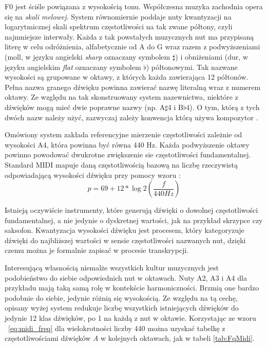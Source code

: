 \documentclass[12pt,a4paper,twoside]{mwart}
\begin{document}
F0 jest ściśle powiązana z wysokością tonu. Współczesna muzyka zachodnia opera się na \textit{skali melowej}. System równomiernie poddaje nuty kwantyzacji na logarytmicznej skali spektrum częstotliwości na tak zwane półtony, czyli najmniejsze interwały. Każda z tak powstałych muzycznych nut ma przypisaną literę w celu odróżnienia, alfabetycznie od A do G wraz razem z podwyższeniami (moll, w języku angielski \textit{sharp} oznaczany symbolem $\sharp$) i obniżeniami (dur, w języku angielskim \textit{flat} oznaczany symbolem $\flat$) półtonowymi. Tak nazwane wysokości są grupowane w oktawy, z których każda zawierająca 12 półtonów. Pełna nazwa granego dźwięku powinna zawierać nazwę literalną wraz z numerem oktawy. Ze względu na tak skonstruowany system nazewnictwa, niektóre z dźwięków mogą mieć dwie poprawne nazwy (np. A$\sharp$4 i B$\flat$4). O tym, którą z tych dwóch nazw należy użyć, zazwyczaj zależy konwencja którą używa kompozytor 
\cite[215-220]{Transcription:Burns:InversalScalesTuning}
.

Omówiony system zakłada referencyjne mierzenie częstotliwości zależnie od wysokości A4, która powinna być równa 440 Hz. Każda podwyższenie oktawy powinno powodować dwukrotne zwiększenie sie częstotliwości fundamentalnej. Standard MIDI mapuje daną częstotliwością bazową na liczbę rzeczywistą odpowiadającą wysokości dźwięku przy pomocy wzoru 
\cite[67-71]{Homerecording:LevelUp}
:
\begin{equation} \label{eq:midi_freq}
p = 69 + 12 * \log{2}(\frac{f}{440 Hz})
\end{equation}

Istnieją oczywiście instrumenty, które generują dźwięki o dowolnej częstotliwości fundamentalnej, a nie jedynie o dyskretnej wartości, jak na przykład skrzypce czy saksofon. Kwantyzacja wysokości dźwięku jest procesem, który kategoryzuje dźwięki do najbliższej wartości w sensie częstotliwości nazwanych nut, dzięki czemu można je formalnie zapisać w procesie transkrypcji.

Interesującą własnością niemalże wszystkich kultur muzycznych jest podobieństwo do siebie odpowiednich nut w oktawach. Nuty A2, A3 i A4 dla przykładu mają taką samą rolę w kontekście harmoniczności. Brzmią one bardzo podobnie do siebie, jedynie różnią się wysokością. Ze względu na tą cechę, opisany wyżej system redukuje liczbę wszystkich istniejących dźwięków do jedynie 12 klas dźwięków, po 1 na każdą z nut w oktawie. Korzystając ze wzoru ~\ref{eq:midi_freq} dla wielokrotności liczby 440 można uzyskać tabelkę z częstotliwościami dźwięków \textit{A} w kolejnych oktawach, jak w tabeli \ref{tab:FqMidi}.
\end{document}
